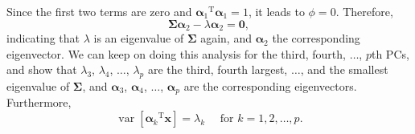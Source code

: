 Since the first two terms are zero and ${\boldsymbol{\alpha}_1}^{\operatorname{T}} \boldsymbol{\alpha}_1=1$, it leads to $\phi=0$. Therefore,
\begin{equation}
	\boldsymbol{\Sigma} \boldsymbol{\alpha}_2-\lambda \boldsymbol{\alpha}_2=\mathbf{0},
\end{equation}
indicating that $\lambda$ is an eigenvalue of $\boldsymbol{\Sigma}$ again, and $\boldsymbol{\alpha}_2$ the corresponding eigenvector. We can keep on doing this analysis for the third, fourth, $\dots$, $p$th PCs, and show that $\lambda_3$, $\lambda_4$, $\dots$, $\lambda_p$ are the third, fourth largest, $\dots$, and the smallest eigenvalue of $\boldsymbol{\Sigma}$, and $\boldsymbol{\alpha}_3$, $\boldsymbol{\alpha}_4$, $\dots$, $\boldsymbol{\alpha}_p$ are the corresponding eigenvectors. Furthermore,
\begin{equation}
	\operatorname{var}\left[{\boldsymbol{\alpha}_k}^{\operatorname{T}} \mathbf{x}\right]=\lambda_k \quad \text { for } k=1,2, \ldots, p.
\end{equation}


